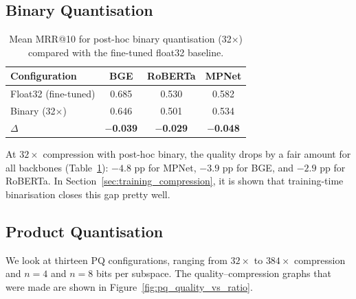 \subsection{Binary Quantisation}
\label{subsec:binary}

\begin{table}[H]
  \centering
  \caption[Post-hoc binary quantisation ($32\times$) vs float32 baseline.]{Mean MRR@10 for post-hoc binary quantisation (32$\times$) compared with the fine-tuned float32 baseline.}
  \label{tab:binary}
  \begin{tabular}{| l | c | c | c |}
    \hline
    \textbf{Configuration} & \textbf{BGE} & \textbf{RoBERTa} & \textbf{MPNet} \\ [0.5ex] \hline
    Float32 (fine-tuned)   & 0.685 & 0.530 & 0.582 \\ \hline
    Binary (32$\times$)    & 0.646 & 0.501 & 0.534 \\ \hline
    \textbf{$\Delta$}      & $\mathbf{-}$\textbf{0.039} & $\mathbf{-}$\textbf{0.029} & $\mathbf{-}$\textbf{0.048} \\ \hline
  \end{tabular}
\end{table}


At $32\times$ compression with post-hoc binary, the quality drops by a
fair amount for all backbones (Table~\ref{tab:binary}): $-4.8$ pp for
MPNet, $-3.9$ pp for BGE, and $-2.9$ pp for RoBERTa. In
Section~\ref{sec:training_compression}, it is shown that training-time
binarisation closes this gap pretty well.

\subsection{Product Quantisation}
\label{subsec:pq}

We look at thirteen PQ configurations, ranging from $32\times$ to
$384\times$ compression and $n = 4$ and $n = 8$ bits per subspace. The
quality--compression graphs that were made are shown in
Figure~\ref{fig:pq_quality_vs_ratio}.

